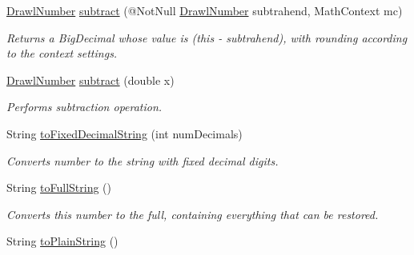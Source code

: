 \begin{DoxyCompactItemize}
\hyperlink{classcom_1_1aarrelaakso_1_1drawl_1_1_drawl_number}{Drawl\+Number} \hyperlink{classcom_1_1aarrelaakso_1_1drawl_1_1_drawl_number_ad36f6189dc4fc67a9606a9702fd10ad5}{subtract} (@Not\+Null \hyperlink{classcom_1_1aarrelaakso_1_1drawl_1_1_drawl_number}{Drawl\+Number} subtrahend, Math\+Context mc)
\begin{DoxyCompactList}\small\item\em Returns a Big\+Decimal whose value is (this -\/ subtrahend), with rounding according to the context settings. \end{DoxyCompactList}\item 
\hyperlink{classcom_1_1aarrelaakso_1_1drawl_1_1_drawl_number}{Drawl\+Number} \hyperlink{classcom_1_1aarrelaakso_1_1drawl_1_1_drawl_number_af26b18ee4dbadbad9cece6dc5e9a02ba}{subtract} (double x)
\begin{DoxyCompactList}\small\item\em Performs subtraction operation. \end{DoxyCompactList}\item 
String \hyperlink{classcom_1_1aarrelaakso_1_1drawl_1_1_drawl_number_abb3852d8cebda506fbcb18f9705522ff}{to\+Fixed\+Decimal\+String} (int num\+Decimals)
\begin{DoxyCompactList}\small\item\em Converts number to the string with fixed decimal digits. \end{DoxyCompactList}\item 
String \hyperlink{classcom_1_1aarrelaakso_1_1drawl_1_1_drawl_number_afa8d185aa5f961e7d54e62c96d788660}{to\+Full\+String} ()
\begin{DoxyCompactList}\small\item\em Converts this number to the full, containing everything that can be restored. \end{DoxyCompactList}\item 
String \hyperlink{classcom_1_1aarrelaakso_1_1drawl_1_1_drawl_number_a07c4c1c3a0e81ae9aef3325bef3e0152}{to\+Plain\+String} ()
\end{DoxyCompactItemize}
